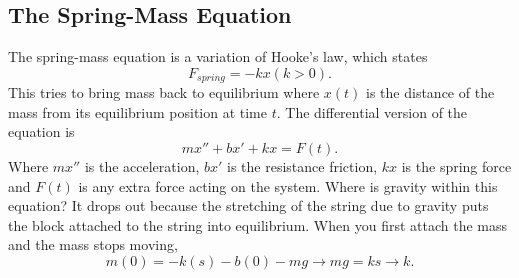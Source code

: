 \subsection{The Spring-Mass Equation}

  The spring-mass equation is a variation of Hooke's law, which states
  \[
    F_{spring}=-kx(k>0)
  .\] 
  This tries to bring mass back to equilibrium where $x(t)$ is the distance of the mass from its equilibrium position at time $t$. The differential version of the equation is
  \[
    mx''+bx'+kx=F(t)
  .\] 
  Where $mx''$ is the acceleration, $bx'$ is the resistance friction, $kx$ is the spring force and $F(t)$ is any extra force acting on the system. Where is gravity within this equation? It drops out because the stretching of the string due to gravity puts the block attached to the string into equilibrium.\newline\newline
  When you first attach the mass and the mass stops moving,
  \[
    m(0)=-k(s)-b(0)-mg\to mg=ks\to k
  .\] 
